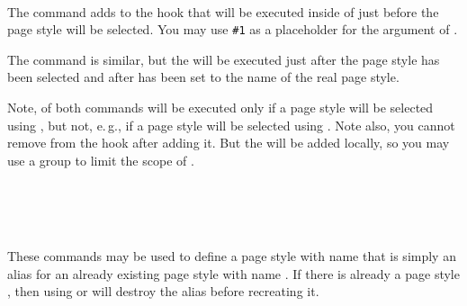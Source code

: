 \begin{Declaration}
  \\
\end{Declaration}
%
%
The command  adds  to the hook
that will be executed inside of  just before the page style
will be selected. You may use \texttt{\#1} as a placeholder for the argument
of .

The command  is similar, but the 
will be executed just after the page style has been selected and after
 has been set to the name of the real page style.

Note,  of both commands will be executed
only if a page style will be selected using , but not,
e.\,g., if a page style will be selected using . Note
also, you cannot remove  from the hook after adding it. But
the  will be added locally, so you may use a group to limit the
scope of .%

\begin{Declaration}
  \\
  \\
  \\
\end{Declaration}
%
%
%
%
These commands may be used to define a page style with name  that is simply an alias for an already existing page style with
name . If there is already a page style
, then using  or
 will destroy the alias before recreating it.

